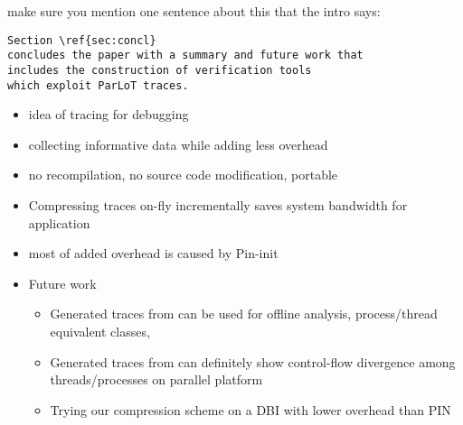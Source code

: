 
make sure you mention one sentence about  this that the intro
says:

\begin{verbatim}
Section \ref{sec:concl}
concludes the paper with a summary and future work that
includes the construction of verification tools
which exploit ParLoT traces.
\end{verbatim}


\begin{itemize}
\item idea of tracing for debugging
\item collecting informative data while adding less overhead 
\item no recompilation, no source code modification, portable
\item Compressing traces on-fly incrementally saves system bandwidth for application
\item most of added overhead is caused by Pin-init
\item Future work
	\begin{itemize}
	\item Generated traces from \parlot can be used for offline analysis, process/thread equivalent classes,
	\item Generated traces from \parlot can definitely show control-flow divergence among threads/processes on parallel platform
	\item Trying our compression scheme on a DBI with lower overhead than PIN
	\end{itemize}

\end{itemize}
